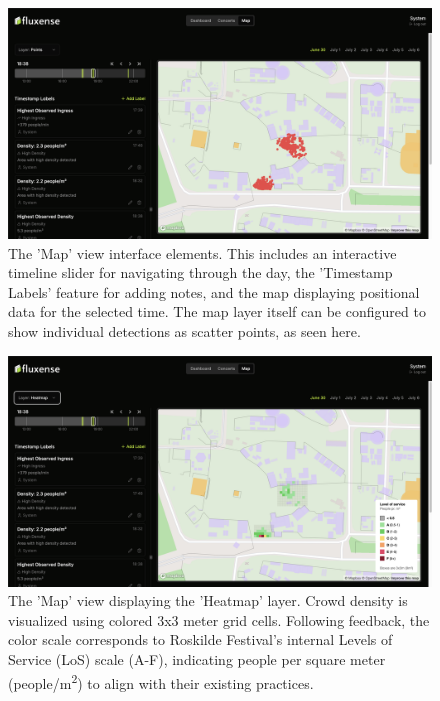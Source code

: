 \begin{figure}[H]
  \centering
  \includegraphics[width=\textwidth]{Pictures/Misc/Frontend/map_points.png}
  \caption{The 'Map' view interface elements. This includes an interactive timeline slider for navigating through the day, the 'Timestamp Labels' feature for adding notes, and the map displaying positional data for the selected time. The map layer itself can be configured to show individual detections as scatter points, as seen here.}
  \label{fig:showcase:map-scatter}

\end{figure}

\begin{figure}[H]
  \centering
  \includegraphics[width=\textwidth]{Pictures/Misc/Frontend/map_density.png}
  \caption{The 'Map' view displaying the 'Heatmap' layer. Crowd density is visualized using colored 3x3 meter grid cells. Following feedback, the color scale corresponds to Roskilde Festival's internal Levels of Service (LoS) scale (A-F), indicating people per square meter (people/m\textsuperscript{2}) to align with their existing practices.}
  \label{fig:showcase:map-density}

\end{figure}

